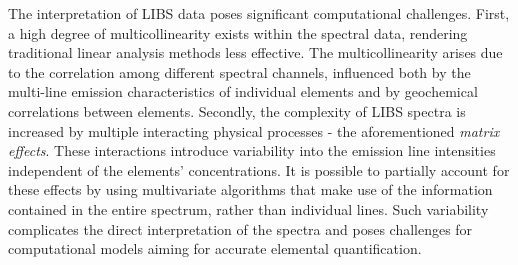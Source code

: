 %

The interpretation of LIBS data poses significant computational challenges.
First, a high degree of multicollinearity exists within the spectral data, rendering traditional linear analysis methods less effective.
The multicollinearity arises due to the correlation among different spectral channels, influenced both by the multi-line emission characteristics of individual elements and by geochemical correlations between elements\cite{andersonImprovedAccuracyQuantitative2017}.
Secondly, the complexity of LIBS spectra is increased by multiple interacting physical processes - the aforementioned \textit{matrix effects}.
These interactions introduce variability into the emission line intensities independent of the elements' concentrations.
It is possible to partially account for these effects by using multivariate algorithms that make use of the information contained in the entire spectrum, rather than individual lines\cite{andersonImprovedAccuracyQuantitative2017}.
Such variability complicates the direct interpretation of the spectra and poses challenges for computational models aiming for accurate elemental quantification.
